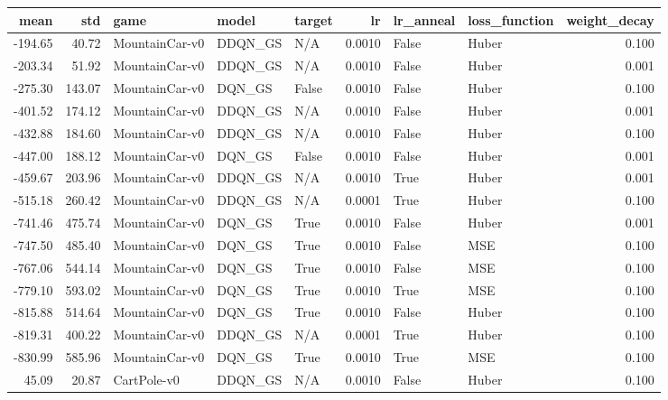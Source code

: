 \begin{tabular}{rrlllrllr}
\toprule
   mean &     std &            game &    model & target &      lr & lr\_anneal & loss\_function &  weight\_decay \\
\midrule
-194.65 &   40.72 &  MountainCar-v0 &  DDQN\_GS &    N/A &  0.0010 &     False &         Huber &         0.100 \\
-203.34 &   51.92 &  MountainCar-v0 &  DDQN\_GS &    N/A &  0.0010 &     False &         Huber &         0.001 \\
-275.30 &  143.07 &  MountainCar-v0 &   DQN\_GS &  False &  0.0010 &     False &         Huber &         0.100 \\
-401.52 &  174.12 &  MountainCar-v0 &  DDQN\_GS &    N/A &  0.0010 &     False &         Huber &         0.001 \\
-432.88 &  184.60 &  MountainCar-v0 &  DDQN\_GS &    N/A &  0.0010 &     False &         Huber &         0.100 \\
-447.00 &  188.12 &  MountainCar-v0 &   DQN\_GS &  False &  0.0010 &     False &         Huber &         0.001 \\
-459.67 &  203.96 &  MountainCar-v0 &  DDQN\_GS &    N/A &  0.0010 &      True &         Huber &         0.001 \\
-515.18 &  260.42 &  MountainCar-v0 &  DDQN\_GS &    N/A &  0.0001 &      True &         Huber &         0.100 \\
-741.46 &  475.74 &  MountainCar-v0 &   DQN\_GS &   True &  0.0010 &     False &         Huber &         0.001 \\
-747.50 &  485.40 &  MountainCar-v0 &   DQN\_GS &   True &  0.0010 &     False &           MSE &         0.100 \\
-767.06 &  544.14 &  MountainCar-v0 &   DQN\_GS &   True &  0.0010 &     False &           MSE &         0.100 \\
-779.10 &  593.02 &  MountainCar-v0 &   DQN\_GS &   True &  0.0010 &      True &           MSE &         0.100 \\
-815.88 &  514.64 &  MountainCar-v0 &   DQN\_GS &   True &  0.0010 &     False &         Huber &         0.100 \\
-819.31 &  400.22 &  MountainCar-v0 &  DDQN\_GS &    N/A &  0.0001 &      True &         Huber &         0.100 \\
-830.99 &  585.96 &  MountainCar-v0 &   DQN\_GS &   True &  0.0010 &      True &           MSE &         0.100 \\
  45.09 &   20.87 &     CartPole-v0 &  DDQN\_GS &    N/A &  0.0010 &     False &         Huber &         0.100 \\

\end{tabular}
